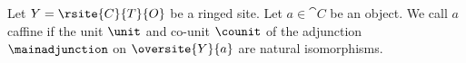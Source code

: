 \begin{definition}
Let $Y = \rsite{C}{T}{O}$ be a ringed site.
Let $a\in \cat{C}$ be an object. 
We call $a$ caffine
if the unit $\unit$ 
and co-unit $\counit$ 
of the adjunction $\mainadjunction$ 
on $\oversite{Y}{a}$ are natural isomorphisms.
\end{definition}